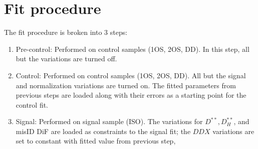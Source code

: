 \section{Fit procedure}
\label{ref:fit:procedure}

The fit procedure is broken into 3 steps:

\begin{enumerate}
    \item Pre-control:
        Performed on control samples (1OS, 2OS, DD).
        In this step, all but the \Kstar variations are turned off.
    \item Control:
        Performed on control samples (1OS, 2OS, DD).
        All but the signal and normalization variations are turned on.
        The fitted parameters from previous steps are loaded along with their
        errors as a starting point for the control fit.
    \item Signal:
        Performed on signal sample (ISO).
        The variations for $D^{**}, D_H^{**}$, and misID DiF are loaded as
        constraints to the signal fit;
        the $DDX$ variations are set to constant with fitted value from previous
        step,
\end{enumerate}
